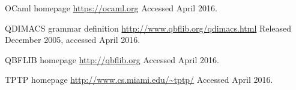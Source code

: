 \begin{thebibliography}{11}
OCaml homepage\newline
\url{https://ocaml.org}\newline
Accessed  April 2016.

QDIMACS grammar definition\newline
\url{http://www.qbflib.org/qdimacs.html}\newline
Released  December 2005, accessed  April 2016.

QBFLIB homepage\newline
\url{http://qbflib.org}\newline
Accessed  April 2016.

TPTP homepage\newline
\url{http://www.cs.miami.edu/\~tptp/}\newline
Accessed  April 2016.

\end{thebibliography}
